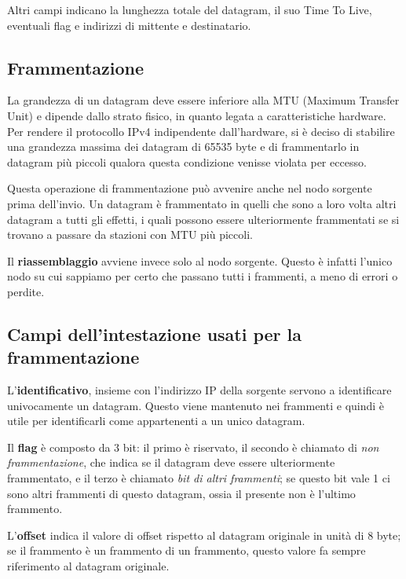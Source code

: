         Altri campi indicano la lunghezza totale del datagram, il suo Time To Live, eventuali flag e indirizzi di mittente e destinatario.
        
    \subsection{Frammentazione}
        La grandezza di un datagram deve essere inferiore alla MTU (Maximum Transfer Unit) e dipende dallo strato fisico, in quanto legata a caratteristiche hardware. Per rendere il protocollo IPv4 indipendente dall'hardware, si è deciso di stabilire una grandezza massima dei datagram di 65535 byte e di frammentarlo in datagram più piccoli qualora questa condizione venisse violata per eccesso.
        
        Questa operazione di frammentazione può avvenire anche nel nodo sorgente prima dell'invio. Un datagram è frammentato in quelli che sono a loro volta altri datagram a tutti gli effetti, i quali possono essere ulteriormente frammentati se si trovano a passare da stazioni con MTU più piccoli.
        
        Il \textbf{riassemblaggio} avviene invece solo al nodo sorgente. Questo è infatti l'unico nodo su cui sappiamo per certo che passano tutti i frammenti, a meno di errori o perdite.
        
    \subsection{Campi dell'intestazione usati per la frammentazione}
        L'\textbf{identificativo}, insieme con l'indirizzo IP della sorgente servono a identificare univocamente un datagram. Questo viene mantenuto nei frammenti e quindi è utile per identificarli come appartenenti a un unico datagram.
        
        Il \textbf{flag} è composto da 3 bit: il primo è riservato, il secondo è chiamato di \textit{non frammentazione}, che indica se il datagram deve essere ulteriormente frammentato, e il terzo è chiamato \textit{bit di altri frammenti}; se questo bit vale 1 ci sono altri frammenti di questo datagram, ossia il presente non è l'ultimo frammento.
        
        L'\textbf{offset} indica il valore di offset rispetto al datagram originale in unità di 8 byte; se il frammento è un frammento di un frammento, questo valore fa sempre riferimento al datagram originale.
        
